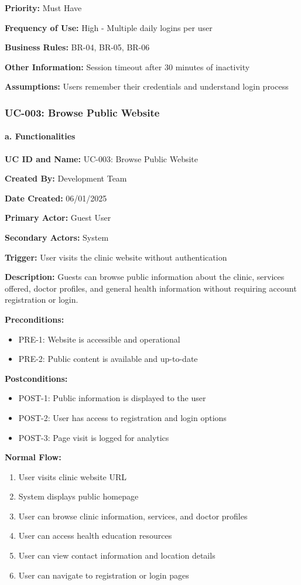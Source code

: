 \documentclass[12pt,a4paper]{article}
\begin{document}
\textbf{Priority:} Must Have

\textbf{Frequency of Use:} High - Multiple daily logins per user

\textbf{Business Rules:} BR-04, BR-05, BR-06

\textbf{Other Information:} Session timeout after 30 minutes of inactivity

\textbf{Assumptions:} Users remember their credentials and understand login process

\subsubsection{UC-003: Browse Public Website}

\paragraph{a. Functionalities}

\textbf{UC ID and Name:} UC-003: Browse Public Website

\textbf{Created By:} Development Team

\textbf{Date Created:} 06/01/2025

\textbf{Primary Actor:} Guest User

\textbf{Secondary Actors:} System

\textbf{Trigger:} User visits the clinic website without authentication

\textbf{Description:} Guests can browse public information about the clinic, services offered, doctor profiles, and general health information without requiring account registration or login.

\textbf{Preconditions:}
\begin{itemize}
\item PRE-1: Website is accessible and operational
\item PRE-2: Public content is available and up-to-date
\end{itemize}

\textbf{Postconditions:}
\begin{itemize}
\item POST-1: Public information is displayed to the user
\item POST-2: User has access to registration and login options
\item POST-3: Page visit is logged for analytics
\end{itemize}

\textbf{Normal Flow:}
\begin{enumerate}
\item User visits clinic website URL
\item System displays public homepage
\item User can browse clinic information, services, and doctor profiles
\item User can access health education resources
\item User can view contact information and location details
\item User can navigate to registration or login pages
\end{enumerate}
\end{document}
